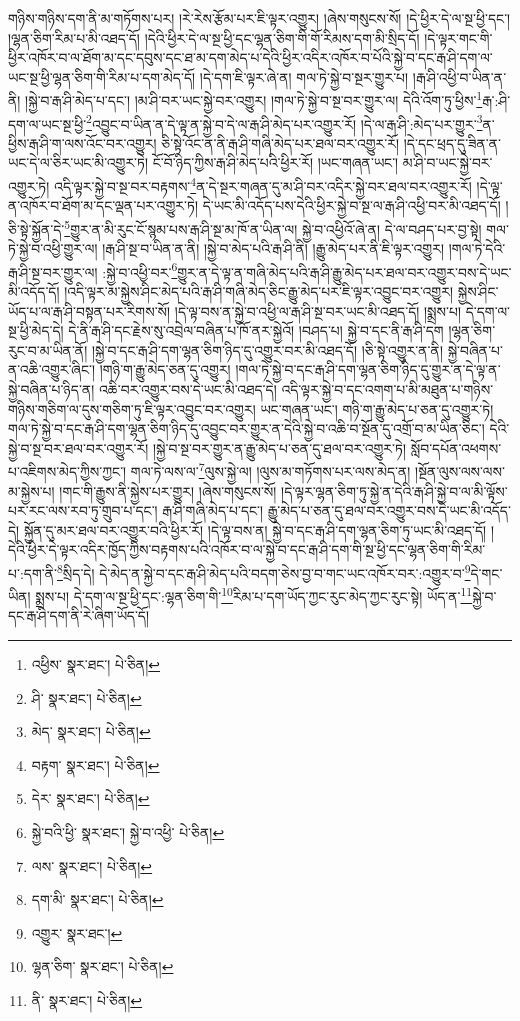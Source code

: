གཉིས་གཉིས་དག་ནི་མ་གཏོགས་པར། །རེ་རེས་རྩོམ་པར་ཇི་ལྟར་འགྱུར། །ཞེས་གསུངས་སོ། །དེ་ཕྱིར་དེ་ལ་སྔ་ཕྱི་དང་། །ལྷན་ཅིག་རིམ་པ་མི་འཐད་དོ། །དེའི་ཕྱིར་དེ་ལ་སྔ་ཕྱི་དང་ལྷན་ཅིག་གི་གོ་རིམས་དག་མི་སྲིད་དོ། །དེ་ལྟར་གང་གི་ཕྱིར་འཁོར་བ་ལ་ཐོག་མ་དང་དབུས་དང་ཐ་མ་དག་མེད་པ་དེའི་ཕྱིར་འདིར་འཁོར་བ་པོའི་སྐྱེ་བ་དང་རྒ་ཤི་དག་ལ་ཡང་སྔ་ཕྱི་ལྷན་ཅིག་གི་རིམ་པ་དག་མེད་དོ། །དེ་དག་ཇི་ལྟར་ཞེ་ན། གལ་ཏེ་སྐྱེ་བ་སྔར་གྱུར་པ། །རྒ་ཤི་འཕྱི་བ་ཡིན་ན་ནི། །སྐྱེ་བ་རྒ་ཤི་མེད་པ་དང་། །མ་ཤི་བར་ཡང་སྐྱེ་བར་འགྱུར། །གལ་ཏེ་སྐྱེ་བ་སྔ་བར་གྱུར་ལ། དེའི་འོག་ཏུ་ཕྱིས་\footnote{འཕྱིས་  སྣར་ཐང་།  པེ་ཅིན། }རྒ་:ཤི་དག་ལ་ཡང་སྔ་ཕྱི་\footnote{ཤི་  སྣར་ཐང་།  པེ་ཅིན། }འབྱུང་བ་ཡིན་ན་དེ་ལྟ་ན་སྐྱེ་བ་དེ་ལ་རྒ་ཤི་མེད་པར་འགྱུར་རོ། །དེ་ལ་རྒ་ཤི་:མེད་པར་གྱུར་\footnote{མེད་  སྣར་ཐང་།  པེ་ཅིན། }ན་ཕྱིས་རྒ་ཤི་ག་ལས་འོང་བར་འགྱུར། ཅི་སྟེ་འོང་ན་ནི་རྒ་ཤི་གཞི་མེད་པར་ཐལ་བར་འགྱུར་རོ། །དེ་དང་ཕྲད་དུ་ཟིན་ན་ཡང་དེ་ལ་ཅིར་ཡང་མི་འགྱུར་ཏེ། ངོ་བོ་ཉིད་ཀྱིས་རྒ་ཤི་མེད་པའི་ཕྱིར་རོ། །ཡང་གཞན་ཡང་། མ་ཤི་བ་ཡང་སྐྱེ་བར་འགྱུར་ཏེ། འདི་ལྟར་སྐྱེ་བ་སྔ་བར་བརྟགས་\footnote{བརྟག་  སྣར་ཐང་།  པེ་ཅིན། }ན་དེ་སྔར་གཞན་དུ་མ་ཤི་བར་འདིར་སྐྱེ་བར་ཐལ་བར་འགྱུར་རོ། །དེ་ལྟ་ན་འཁོར་བ་ཐོག་མ་དང་ལྡན་པར་འགྱུར་ཏེ། དེ་ཡང་མི་འདོད་པས་དེའི་ཕྱིར་སྐྱེ་བ་སྔ་ལ་རྒ་ཤི་འཕྱི་བར་མི་འཐད་དོ། །ཅི་སྟེ་སྐྱོན་དེ་\footnote{དེར་  སྣར་ཐང་།  པེ་ཅིན། }གྱུར་ན་མི་རུང་ངོ་སྙམ་པས་རྒ་ཤི་སྔ་མ་ཁོ་ན་ཡིན་ལ། སྐྱེ་བ་འཕྱིའོ་ཞེ་ན། དེ་ལ་བཤད་པར་བྱ་སྟེ། གལ་ཏེ་སྐྱེ་བ་འཕྱི་གྱུར་ལ། །རྒ་ཤི་སྔ་བ་ཡིན་ན་ནི། །སྐྱེ་བ་མེད་པའི་རྒ་ཤི་ནི། །རྒྱུ་མེད་པར་ནི་ཇི་ལྟར་འགྱུར། །གལ་ཏེ་དེའི་རྒ་ཤི་སྔ་བར་གྱུར་ལ། :སྐྱེ་བ་འཕྱི་བར་\footnote{སྐྱེ་བའི་ཕྱི་  སྣར་ཐང་། སྐྱེ་བ་འཕྱི་  པེ་ཅིན། }གྱུར་ན་དེ་ལྟ་ན་གཞི་མེད་པའི་རྒ་ཤི་རྒྱུ་མེད་པར་ཐལ་བར་འགྱུར་བས་དེ་ཡང་མི་འདོད་དོ། །འདི་ལྟར་མ་སྐྱེས་ཤིང་མེད་པའི་རྒ་ཤི་གཞི་མེད་ཅིང་རྒྱུ་མེད་པར་ཇི་ལྟར་འབྱུང་བར་འགྱུར། སྐྱེས་ཤིང་ཡོད་པ་ལ་རྒ་ཤི་བསྟན་པར་རིགས་སོ། །དེ་ལྟ་བས་ན་སྐྱེ་བ་འཕྱི་ལ་རྒ་ཤི་སྔ་བར་ཡང་མི་འཐད་དོ། །སྨྲས་པ། དེ་དག་ལ་སྔ་ཕྱི་མེད་དེ། དེ་ནི་རྒ་ཤི་དང་རྗེས་སུ་འབྲེལ་བཞིན་པ་ཁོ་ནར་སྐྱེའོ། །བཤད་པ། སྐྱེ་བ་དང་ནི་རྒ་ཤི་དག །ལྷན་ཅིག་རུང་བ་མ་ཡིན་ནོ། །སྐྱེ་བ་དང་རྒ་ཤི་དག་ལྷན་ཅིག་ཉིད་དུ་འགྱུར་བར་མི་འཐད་དོ། །ཅི་སྟེ་འགྱུར་ན་ནི། སྐྱེ་བཞིན་པ་ན་འཆི་འགྱུར་ཞིང་། །གཉི་ག་རྒྱུ་མེད་ཅན་དུ་འགྱུར། །གལ་ཏེ་སྐྱེ་བ་དང་རྒ་ཤི་དག་ལྷན་ཅིག་ཉིད་དུ་གྱུར་ན་དེ་ལྟ་ན་སྐྱེ་བཞིན་པ་ཉིད་ན། འཆི་བར་འགྱུར་བས་དེ་ཡང་མི་འཐད་དེ། འདི་ལྟར་སྐྱེ་བ་དང་འགག་པ་མི་མཐུན་པ་གཉིས་གཉིས་གཅིག་ལ་དུས་གཅིག་ཏུ་ཇི་ལྟར་འབྱུང་བར་འགྱུར། ཡང་གཞན་ཡང་། གཉི་ག་རྒྱུ་མེད་པ་ཅན་དུ་འགྱུར་ཏེ། གལ་ཏེ་སྐྱེ་བ་དང་རྒ་ཤི་དག་ལྷན་ཅིག་ཉིད་དུ་འབྱུང་བར་གྱུར་ན་དེའི་སྐྱེ་བ་འཆི་བ་སྔོན་དུ་འགྲོ་བ་མ་ཡིན་ཅིང་། དེའི་སྐྱེ་བ་སྔ་བར་ཐལ་བར་འགྱུར་རོ། །སྐྱེ་བ་སྔ་བར་གྱུར་ན་རྒྱུ་མེད་པ་ཅན་དུ་ཐལ་བར་འགྱུར་ཏེ། སློབ་དཔོན་འཕགས་པ་འཇིགས་མེད་ཀྱིས་ཀྱང་། གལ་ཏེ་ལས་ལ་\footnote{ལས་  སྣར་ཐང་།  པེ་ཅིན། }ལུས་སྐྱེ་ལ། །ལུས་མ་གཏོགས་པར་ལས་མེད་ན། །སྔོན་ལུས་ལས་ལས་མ་སྐྱེས་པ། །གང་གི་རྒྱུས་ནི་སྐྱེས་པར་གྱུར། །ཞེས་གསུངས་སོ། །དེ་ལྟར་ལྷན་ཅིག་ཏུ་སྐྱེ་ན་དེའི་རྒ་ཤི་སྐྱེ་བ་ལ་མི་ལྟོས་པར་རང་ལས་རབ་ཏུ་གྲུབ་པ་དང་། རྒ་ཤི་གཞི་མེད་པ་དང་། རྒྱུ་མེད་པ་ཅན་དུ་ཐལ་བར་འགྱུར་བས་དེ་ཡང་མི་འདོད་དེ། སྐྱོན་དུ་མར་ཐལ་བར་འགྱུར་བའི་ཕྱིར་རོ། །དེ་ལྟ་བས་ན། སྐྱེ་བ་དང་རྒ་ཤི་དག་ལྷན་ཅིག་ཏུ་ཡང་མི་འཐད་དོ། །དེའི་ཕྱིར་དེ་ལྟར་འདིར་ཁྱོད་ཀྱིས་བརྟགས་པའི་འཁོར་བ་ལ་སྐྱེ་བ་དང་རྒ་ཤི་དག་གི་སྔ་ཕྱི་དང་ལྷན་ཅིག་གི་རིམ་པ་:དག་ནི་\footnote{དག་མི་  སྣར་ཐང་།  པེ་ཅིན། }སྲིད་དེ། དེ་མེད་ན་སྐྱེ་བ་དང་རྒ་ཤི་མེད་པའི་བདག་ཅེས་བྱ་བ་གང་ཡང་འཁོར་བར་:འགྱུར་བ་\footnote{འགྱུར་  སྣར་ཐང་། }དེ་གང་ཡིན། སྨྲས་པ། དེ་དག་ལ་སྔ་ཕྱི་དང་:ལྷན་ཅིག་གི་\footnote{ལྷན་ཅིག་  སྣར་ཐང་།  པེ་ཅིན། }རིམ་པ་དག་ཡོད་ཀྱང་རུང་མེད་ཀྱང་རུང་སྟེ། ཡོད་ན་\footnote{ནི་  སྣར་ཐང་།  པེ་ཅིན། }སྐྱེ་བ་དང་རྒ་ཤི་དག་ནི་རེ་ཞིག་ཡོད་དོ། 
